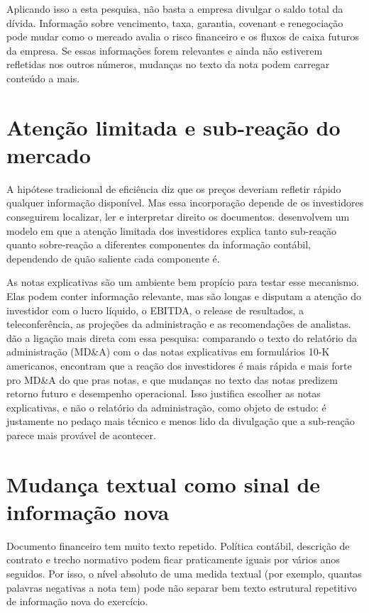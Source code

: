 \documentclass[a4paper,12pt]{report}
\begin{document}
Aplicando isso a esta pesquisa, não basta a empresa divulgar o saldo total da dívida. Informação sobre vencimento, taxa, garantia, covenant e renegociação pode mudar como o mercado avalia o risco financeiro e os fluxos de caixa futuros da empresa. Se essas informações forem relevantes e ainda não estiverem refletidas nos outros números, mudanças no texto da nota podem carregar conteúdo a mais.

\section{Atenção limitada e sub-reação do mercado}

A hipótese tradicional de eficiência diz que os preços deveriam refletir rápido qualquer informação disponível. Mas essa incorporação depende de os investidores conseguirem localizar, ler e interpretar direito os documentos.  desenvolvem um modelo em que a atenção limitada dos investidores explica tanto sub-reação quanto sobre-reação a diferentes componentes da informação contábil, dependendo de quão saliente cada componente é.

As notas explicativas são um ambiente bem propício para testar esse mecanismo. Elas podem conter informação relevante, mas são longas e disputam a atenção do investidor com o lucro líquido, o EBITDA, o release de resultados, a teleconferência, as projeções da administração e as recomendações de analistas.  dão a ligação mais direta com essa pesquisa: comparando o texto do relatório da administração (MD\&A) com o das notas explicativas em formulários 10-K americanos, encontram que a reação dos investidores é mais rápida e mais forte pro MD\&A do que pras notas, e que mudanças no texto das notas predizem retorno futuro e desempenho operacional. Isso justifica escolher as notas explicativas, e não o relatório da administração, como objeto de estudo: é justamente no pedaço mais técnico e menos lido da divulgação que a sub-reação parece mais provável de acontecer.

\section{Mudança textual como sinal de informação nova}

Documento financeiro tem muito texto repetido. Política contábil, descrição de contrato e trecho normativo podem ficar praticamente iguais por vários anos seguidos. Por isso, o nível absoluto de uma medida textual (por exemplo, quantas palavras negativas a nota tem) pode não separar bem texto estrutural repetitivo de informação nova do exercício.
\end{document}
